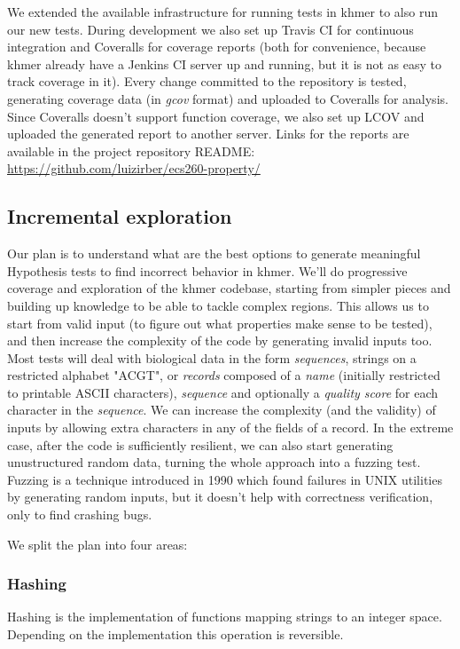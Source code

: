 \documentclass[preprint,nocopyrightspace]{sig-alternate}
\begin{document}
We extended the available infrastructure for running tests in khmer to also run our new tests.
During development we also set up Travis CI for continuous integration and Coveralls for coverage reports
(both for convenience,
because khmer already have a Jenkins CI server up and running,
but it is not as easy to track coverage in it).
Every change committed to the repository is tested,
generating coverage data (in \emph{gcov} format) and uploaded to Coveralls for analysis.
Since Coveralls doesn't support function coverage,
we also set up LCOV and uploaded the generated report to another server.
Links for the reports are available in the project repository README:
\url{https://github.com/luizirber/ecs260-property/}

\subsection{Incremental exploration}
Our plan is to understand what are the best options to generate meaningful Hypothesis tests to find incorrect behavior in khmer.
We'll do progressive coverage and exploration of the khmer codebase,
starting from simpler pieces and building up knowledge to be able to tackle complex regions.
This allows us to start from valid input (to figure out what properties make sense to be tested),
and then increase the complexity of the code by generating invalid inputs too.
Most tests will deal with biological data in the form \emph{sequences},
strings on a restricted alphabet "ACGT",
or \emph{records} composed of a \emph{name} (initially restricted to printable ASCII characters), \emph{sequence} and optionally a \emph{quality score} for each character in the \emph{sequence}.
We can increase the complexity (and the validity) of inputs by allowing extra characters in any of the fields of a record.
In the extreme case,
after the code is sufficiently resilient,
we can also start generating unustructured random data,
turning the whole approach into a fuzzing test.
Fuzzing \citet{qi2013research} is a technique introduced in 1990 which found failures in UNIX utilities by generating random inputs,
but it doesn't help with correctness verification,
only to find crashing bugs.

We split the plan into four areas:

\subsubsection{Hashing}
Hashing is the implementation of functions mapping strings to an integer space.
Depending on the implementation this operation is reversible.
\end{document}
